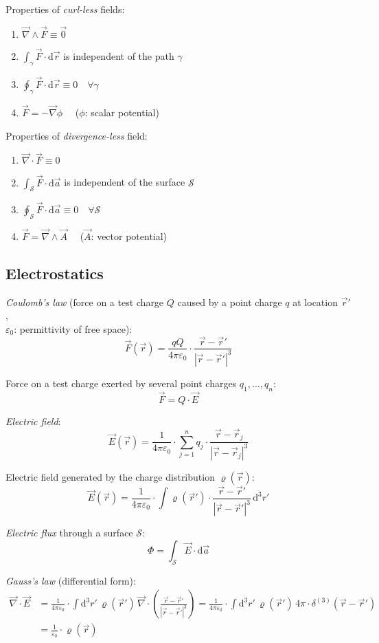 \documentclass[fontsize=11pt,a4paper]{scrartcl}
\begin{document}
Properties of \emph{curl-less} fields:
\begin{enumerate}
	\item $\vec\nabla\wedge\vec F\equiv\vec 0$
	\item $\int_\gamma\vec F\cdot\mathrm{d}\vec r$ is independent of the path $\gamma$
	\item $\oint_\gamma\vec F\cdot\mathrm{d}\vec r\equiv 0\quad\forall\gamma$
	\item $\vec F=-\vec\nabla \phi\quad$ ($\phi$: scalar potential)
\end{enumerate}

Properties of \emph{divergence-less} field:
\begin{enumerate}
	\item $\vec\nabla\cdot\vec F\equiv 0$
	\item $\int_\mathcal{S}\vec F\cdot\mathrm{d}\vec a$ is independent of the surface $\mathcal{S}$
	\item $\oint_\mathcal{S}\vec F\cdot\mathrm{d}\vec a\equiv 0\quad\forall \mathcal{S}$
	\item $\vec F=\vec\nabla\wedge\vec A\quad$ ($\vec A$: vector potential)
\end{enumerate}
%
%
%
%
\subsection{Electrostatics}
\emph{Coulomb's law} (force on a test charge $Q$ caused by a point charge $q$ at location $\vec r'$,\\ $\varepsilon_0$: permittivity of free space):
\[
	\vec F(\vec r) = \frac{qQ}{4\pi\varepsilon_0}\cdot\frac{\vec r-\vec r'}{|\vec r-\vec r'|^3}
\]

Force on a test charge exerted by several point charges $q_1,\dots,q_n$:
\[
	\vec F = Q\cdot\vec E
\]

\emph{Electric field}:
\[
	\vec E(\vec r) = \frac{1}{4\pi\varepsilon_0}\cdot\sum_{j=1}^n q_j\cdot\frac{\vec r-\vec r_j}{|\vec r-\vec r_j|^3}
\]

Electric field generated by the charge distribution $\varrho(\vec r)$:
\[
	\vec E(\vec r) = \frac{1}{4\pi\varepsilon_0}\cdot\int\varrho(\vec r')\cdot\frac{\vec r-\vec r'}{|\vec r-\vec r'|^3}\,\mathrm{d}^3 r'
\]

\emph{Electric flux} through a surface $\mathcal{S}$:
\[
	\Phi = \int_\mathcal{S}\vec E\cdot\mathrm{d}\vec a
\]

\emph{Gauss's law} (differential form):
\begin{equation*}
\begin{split}
	\vec\nabla\cdot\vec E &= \frac{1}{4\pi\varepsilon_0}\cdot\int\mathrm{d}^3 r'\,\varrho(\vec r')\,\vec\nabla\cdot\left(\frac{\vec r-\vec r'}{|\vec r-\vec r'|^3}\right)
	                         = \frac{1}{4\pi\varepsilon_0}\cdot\int\mathrm{d}^3 r'\,\varrho(\vec r')\,4\pi\cdot\delta^{(3)}(\vec r-\vec r')\\
	                      &= \frac{1}{\varepsilon_0}\cdot\varrho(\vec r)
\end{split}
\end{equation*}
\end{document}
